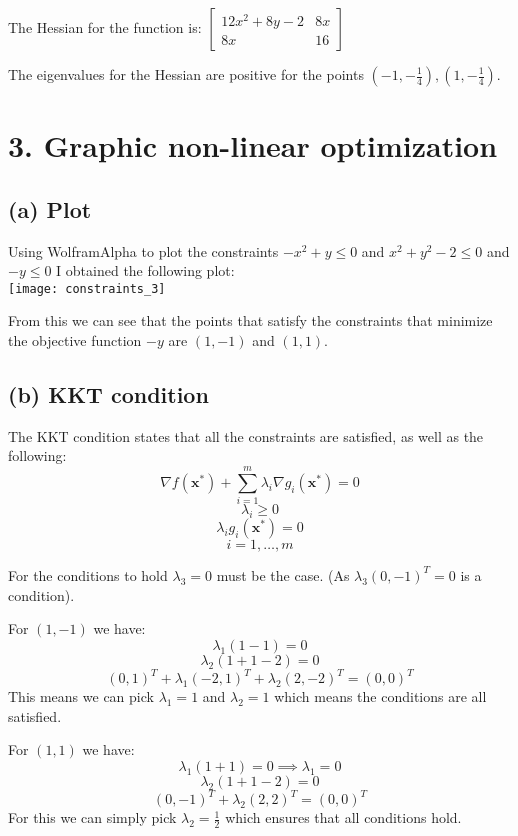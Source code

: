 \documentclass[12pt]{report}
\begin{document}
The Hessian for the function is:
$
\begin{bmatrix}
	12x^2+8y-2 & 8x \\
	8x & 16
\end{bmatrix}
$

The eigenvalues for the Hessian are positive for the points $(-1,-\frac{1}{4}), (1,-\frac{1}{4})$.



\section*{3. Graphic non-linear optimization}

\subsection*{(a) Plot}
	Using WolframAlpha to plot the constraints $-x^2+y\le0$ and $x^2+y^2-2\le0$ and $-y\le0$ I obtained the following plot: \\
	\texttt{[image: constraints\_3]}

	From this we can see that the points that satisfy the constraints that minimize the objective function $-y$ are $(1,-1)$ and $(1,1)$.

\subsection*{(b) KKT condition}

	The KKT condition states that all the constraints are satisfied, as well as the following: \\
		$$\nabla f(\textbf{x}^*) + \sum_{i=1}^{m} \lambda_i \nabla g_i(\textbf{x}^*) = 0 $$
		$$ \lambda_i \ge 0 $$
		$$ \lambda_i g_i(\textbf{x}^*) = 0 $$
		$$i = 1,\ldots,m$$


		For the conditions to hold $\lambda_3 = 0$ must be the case. (As $\lambda_3(0,-1)^T = 0$ is a condition). 

		For $(1,-1)$ we have:
		$$ \lambda_1 (1-1) = 0  $$
		$$ \lambda_2 (1+1-2) = 0$$
		$$ (0,1)^T + \lambda_1(-2,1)^T + \lambda_2 (2,-2)^T = (0,0)^T$$
		This means we can pick $\lambda_1=1$ and $\lambda_2=1$ which means the conditions are all satisfied.

		For $(1,1)$ we have:
		$$ \lambda_1 (1+1) = 0 \implies \lambda_1 = 0  $$
		$$ \lambda_2 (1+1-2) = 0$$
		$$ (0,-1)^T + \lambda_2 (2,2)^T = (0,0)^T$$
		For this we can simply pick $\lambda_2 = \frac{1}{2}$ which ensures that all conditions hold.
\end{document}

